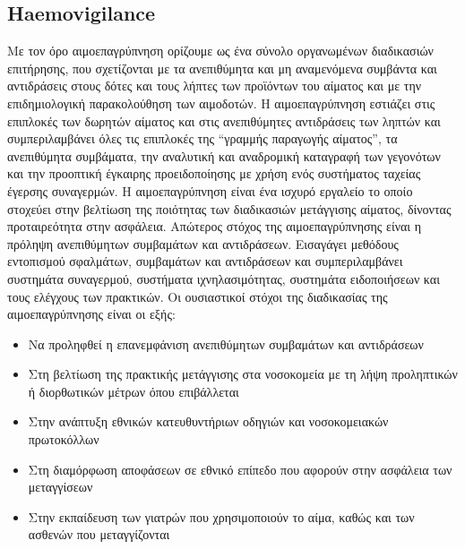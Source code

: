 	\subsection{Haemovigilance}
	Με τον όρο αιμοεπαγρύπνηση ορίζουμε ως ένα σύνολο οργανωμένων διαδικασιών επιτήρησης, που σχετίζονται με τα ανεπιθύμητα και μη αναμενόμενα συμβάντα και αντιδράσεις στους δότες και τους λήπτες των προϊόντων του αίματος και με την επιδημιολογική παρακολούθηση των αιμοδοτών. \cite{VOX:VOX1442}Η αιμοεπαγρύπνηση εστιάζει στις  επιπλοκές των δωρητών αίματος και στις ανεπιθύμητες αντιδράσεις των ληπτών και συμπεριλαμβάνει όλες τις επιπλοκές της “γραμμής παραγωγής αίματος”, τα ανεπιθύμητα συμβάματα, την αναλυτική και αναδρομική καταγραφή των γεγονότων και την προοπτική έγκαιρης προειδοποίησης με χρήση ενός συστήματος ταχείας έγερσης συναγερμών. Η αιμοεπαγρύπνηση είναι ένα ισχυρό εργαλείο το οποίο στοχεύει στην βελτίωση της ποιότητας των διαδικασιών μετάγγισης αίματος, δίνοντας προταιρεότητα στην ασφάλεια. Απώτερος στόχος της αιμοεπαγρύπνησης είναι η πρόληψη ανεπιθύμητων συμβαμάτων και αντιδράσεων. Εισαγάγει μεθόδους εντοπισμού σφαλμάτων, συμβαμάτων και αντιδράσεων και συμπεριλαμβάνει συστημάτα συναγερμού, συστήματα ιχνηλασιμότητας, συστημάτα ειδοποιήσεων και τους ελέγχους των πρακτικών.
	Οι ουσιαστικοί στόχοι της διαδικασίας της αιμοεπαγρύπνησης είναι οι εξής:
		\begin{itemize}
		\item Να προληφθεί η επανεμφάνιση ανεπιθύμητων συμβαμάτων και αντιδράσεων 
		\item Στη βελτίωση της πρακτικής μετάγγισης στα νοσοκομεία με τη λήψη προληπτικών ή διορθωτικών μέτρων όπου επιβάλλεται 
		\item Στην ανάπτυξη εθνικών κατευθυντήριων οδηγιών και νοσοκομειακών πρωτοκόλλων 
		\item Στη διαμόρφωση αποφάσεων σε εθνικό επίπεδο που αφορούν στην ασφάλεια των μεταγγίσεων 
		\item Στην εκπαίδευση των γιατρών που χρησιμοποιούν το αίμα, καθώς και των ασθενών που μεταγγίζονται 
		\end{itemize}

